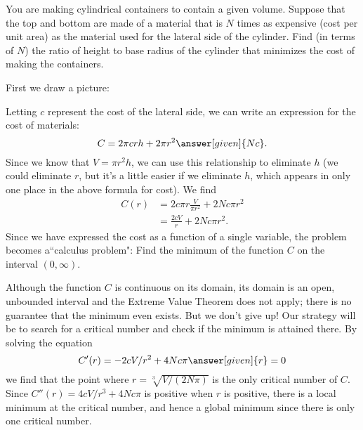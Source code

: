 \documentclass{ximera}
\begin{document}
\begin{example}
You are making cylindrical containers to contain a given volume.  Suppose
that the top and bottom are made of a material that is $N$ times as
expensive (cost per unit area) as the material used for the lateral side of
the cylinder.  Find (in terms of $N$) the ratio of height to base radius of
the cylinder that minimizes the cost of making the containers.
\begin{explanation}
  First we draw a picture:
\begin{image}
\end{image}
  Letting $c$ represent the cost of the lateral side, we can write an
  expression for the cost of materials:
  \[
  C = 2\pi c r h+2\pi r^{2}\answer[given]{Nc}.
  \]
  Since we know that $V=\pi r^2h$, we can use this relationship to
  eliminate $h$ (we could eliminate $r$, but it's a little easier if we
  eliminate $h$, which appears in only one place in the above formula
  for cost).  We find
\begin{align*}
  C(r)&=2c\pi r\frac{V}{\pi r^2}+2Nc\pi r^2\\
  &=\frac{2cV}{r}+2Nc\pi r^2.
\end{align*}
Since we have expressed the cost as a function of a single variable, the problem becomes a``calculus problem": Find the minimum of the function $C$ on the interval 
$(0,\infty)$.

 Although the function $C$ is continuous on its domain, its domain is an open, unbounded interval and the Extreme Value Theorem does not apply; there is no guarantee that the minimum even exists. But we don't give up! Our strategy will be to search for a critical number and check if the minimum is attained there. By solving the equation
\[
C'(r)=-2cV/r^2+4Nc\pi \answer[given]{r} =0
\]
we find that the point where $r=\sqrt[3]{V/(2N\pi)}$ is the only critical number of $C$.  Since $C''(r)=4cV/r^3+4Nc\pi$ is
positive when $r$ is positive, there is a local minimum at the
critical number, and hence a global minimum since there is only one
critical number.


\end{explanation}
\end{example}
\end{document}
